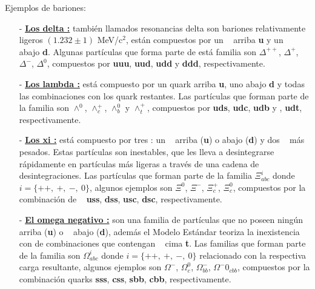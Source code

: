 Ejemplos de bariones:
\begin{itemize}
\item[-] \href{https://es.wikipedia.org/wiki/Bari\%C3\%B3n_delta}{\textbf{Los delta :}} también llamados resonancias delta son bariones relativamente ligeros $(1.232\pm 1)$ MeV/c$^2$, están compuestos por un \quark ~ arriba \textbf{u} y un \quark ~ abajo \textbf{d}. Algunas partículas que forma parte de está familia son $\Delta^{++}$, $\Delta^{+}$, $\Delta^{-}$, $\Delta^{0}$, compuestos por \textbf{uuu}, \textbf{uud}, \textbf{udd} y \textbf{ddd}, respectivamente.

\item[-] \href{https://es.wikipedia.org/wiki/Bari\%C3\%B3n_lambda}{\textbf{Los lambda :}} está compuesto por un quark arriba \textbf{u}, uno abajo \textbf{d} y todas las combinaciones con los quark restantes. Las partículas que forman parte de la familia son $\wedge^0$, $\wedge^+_c$, $\wedge^0_b$ y $\wedge^+_t$, compuestos por \textbf{uds}, \textbf{udc}, \textbf{udb} y , \textbf{udt}, respectivamente. 

\item[-] \href{https://es.wikipedia.org/wiki/Bari\%C3\%B3n_xi}{\textbf{Los xi :}} está compuesto por tres \quarks : un \quark ~ arriba (\textbf{u}) o abajo (\textbf{d}) y dos \quarks ~ más pesados. Estas partículas son inestables, que les lleva a desintegrarse rápidamente en partículas más ligeras a través de una cadena de desintegraciones. Las partículas que forman parte de la familia $\Xi^i_{abc}$ donde $i=\{++,~ +,~ -,~ 0\}$, algunos ejemplos son $\Xi^0$, $\Xi^-$, $\Xi^+_{c}$, $\Xi^0_{c}$, compuestos por la combinación de \quarks ~ \textbf{uss}, \textbf{dss}, \textbf{usc}, \textbf{dsc}, respectivamente.

\item[-] \href{https://es.wikipedia.org/wiki/Bari\%C3\%B3n_omega}{\textbf{El omega negativo :}} son una familia de partículas que no poseen ningún \quark ~ arriba (\textbf{u}) o \quark ~ abajo (\textbf{d}), además el Modelo Estándar teoriza la inexistencia con de combinaciones que contengan \quarks ~ cima \textbf{t}. Las familias que forman parte de la familia son $\Omega^i_{abc}$ donde $i=\{++,~ +,~ -,~ 0\}$ relacionado con la respectiva carga resultante, algunos ejemplos son $\Omega^-$, $\Omega^0_c$, $\Omega^-_{bb}$, $\Omega^-0_{cbb}$, compuestos por la combinación quarks \textbf{sss}, \textbf{css}, \textbf{sbb}, \textbf{cbb}, respectivamente.


\end{itemize}
